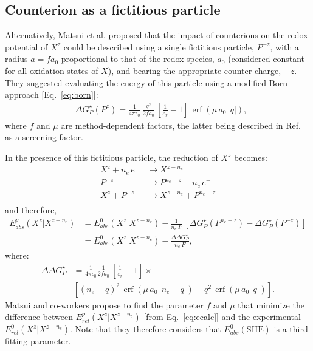 \documentclass[review]{elsarticle}
\DeclareMathOperator{\erf}{erf}
\begin{document}
\subsection{Counterion as a fictitious particle}

Alternatively, Matsui et al. \cite{matsuiDensityFunctionalTheory2013} proposed that the impact of counterions on the redox potential of $X^z$ could be described using a single fictitious particle, $P^{-z}$, with a radius $a=fa_0$ proportional to that of the redox species, $a_0$ (considered constant for all oxidation states of $X$), and bearing the appropriate counter-charge, $-z$. They suggested evaluating the energy of this particle using a modified Born approach [Eq.~\eqref{eq:born}]:\begin{align}
	&\Delta G^\star_{P}(P^z) = \frac{1}{4\pi\epsilon_0}\, \frac{q^2}{2fa_0}\,\left[\frac{1}{\varepsilon_r}-1\right]\,\erf(\mu\,a_0\,|q|),
\end{align}
where $f$ and $\mu$ are method-dependent factors, the latter being described in Ref.~\cite{matsuiDensityFunctionalTheory2013} as a screening factor.


In the presence of this fictitious particle, the reduction of $X^z$ becomes:\begin{equation*}
	\begin{array}{rl}
		X^z + n_e\,e^- &\rightarrow X^{z-n_e} \\
		P^{-z} \phantom{ + n_e\,e^-} &\rightarrow P^{n_e-z} + n_e\,e^- \\
		\hline
		X^z + P^{-z}&\rightarrow X^{z-n_e} +P^{n_e-z}\\
	\end{array}  \label{eq:corr}
\end{equation*}
and therefore,\begin{align}
	E^p_{abs}(X^z|X^{z-n_e}) &= 	E_{abs}^0(X^{z}|X^{z-n_e}) -\frac{1}{n_e\,F}\,[\Delta G^\star_{P}(P^{n_e-z}) - \Delta G^\star_{P}(P^{-z})] \nonumber\\
	&= 	E_{abs}^0(X^{z}|X^{z-n_e}) -\frac{\Delta\Delta G^\star_P}{n_e\,F}, \label{eq:matsui} 
\end{align}
where:\begin{align*}
	\Delta\Delta G^\star_P&=\frac{1}{4\pi\epsilon_0}\frac{1}{2fa_0}\,\left[\frac{1}{\varepsilon_r}-1\right]\times\nonumber\\
	&\left[ (n_e-q)^2\,\erf(\mu\,a_0\,|n_e-q|)-q^2\,\erf(\mu\,a_0\,|q|)\right].
\end{align*}
Matsui and co-workers propose to  find the parameter $f$ and $\mu$ that minimize the difference between $E^p_{rel}(X^z|X^{z-n_e})$  [from Eq.~\eqref{eq:ecalc}] and the experimental $E^0_{rel}(X^z|X^{z-n_e})$.  Note that they therefore considers that $ E^{0}_{abs}(\text{SHE})$ is a third fitting parameter.
\end{document}
